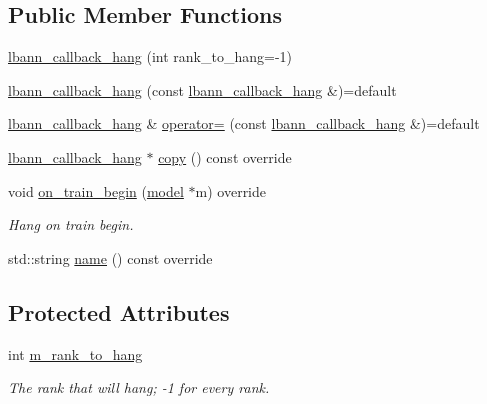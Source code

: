 \subsection*{Public Member Functions}
\begin{DoxyCompactItemize}
\item 
\hyperlink{classlbann_1_1lbann__callback__hang_af5e29a2d416e3268a495df8370b272b6}{lbann\+\_\+callback\+\_\+hang} (int rank\+\_\+to\+\_\+hang=-\/1)
\item 
\hyperlink{classlbann_1_1lbann__callback__hang_a0633c81998abdfea74a2bdcc38245217}{lbann\+\_\+callback\+\_\+hang} (const \hyperlink{classlbann_1_1lbann__callback__hang}{lbann\+\_\+callback\+\_\+hang} \&)=default
\item 
\hyperlink{classlbann_1_1lbann__callback__hang}{lbann\+\_\+callback\+\_\+hang} \& \hyperlink{classlbann_1_1lbann__callback__hang_aef5c147b4f6cf94492564238d049f34d}{operator=} (const \hyperlink{classlbann_1_1lbann__callback__hang}{lbann\+\_\+callback\+\_\+hang} \&)=default
\item 
\hyperlink{classlbann_1_1lbann__callback__hang}{lbann\+\_\+callback\+\_\+hang} $\ast$ \hyperlink{classlbann_1_1lbann__callback__hang_a047660bd517f5c669c8e2abc4f2e951f}{copy} () const override
\item 
void \hyperlink{classlbann_1_1lbann__callback__hang_ada39fd10375143a26c99e0a32d4368ce}{on\+\_\+train\+\_\+begin} (\hyperlink{classlbann_1_1model}{model} $\ast$m) override
\begin{DoxyCompactList}\small\item\em Hang on train begin. \end{DoxyCompactList}\item 
std\+::string \hyperlink{classlbann_1_1lbann__callback__hang_a3aa4a28d16f21dd6bd86fd6ebaa0e0fa}{name} () const override
\end{DoxyCompactItemize}
\subsection*{Protected Attributes}
\begin{DoxyCompactItemize}
\item 
int \hyperlink{classlbann_1_1lbann__callback__hang_a6dbd84f40c31b3b1ec3247c8da08a954}{m\+\_\+rank\+\_\+to\+\_\+hang}
\begin{DoxyCompactList}\small\item\em The rank that will hang; -\/1 for every rank. \end{DoxyCompactList}\end{DoxyCompactItemize}


